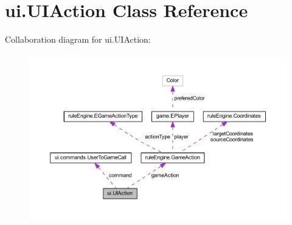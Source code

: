 \hypertarget{classui_1_1_u_i_action}{}\section{ui.\+U\+I\+Action Class Reference}
\label{classui_1_1_u_i_action}


Collaboration diagram for ui.\+U\+I\+Action\+:
\nopagebreak
\begin{figure}[H]
\begin{center}
\leavevmode
\includegraphics[width=350pt]{classui_1_1_u_i_action__coll__graph}
\end{center}
\end{figure}
